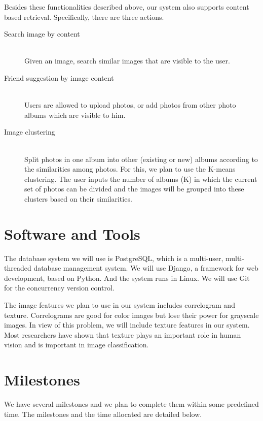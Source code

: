 \documentclass[a4paper,12pt]{article}
\begin{document}
{Besides these functionalities described above, our system also supports content based retrieval. Specifically, there are three actions. 

\begin{description}
  \item[Search image by content] \hfill \\
  Given an image, search similar images that are visible to the user.
  \item[Friend suggestion by image content] \hfill \\
  Users are allowed to upload photos, or add photos from other photo albums which are visible to him. 
  \item[Image clustering] \hfill \\
  Split photos in one album into other (existing or new) albums according to the similarities among photos. For this, we plan to use the K-means clustering. The user inputs the number of albums (K) in which the current set of photos can be divided and the images will be grouped into these clusters based on their similarities.
\end{description}

\section*{Software and Tools}
The database system we will use is PostgreSQL\cite{postgres}, which is a multi-user, multi-threaded database management system. We will use Django\cite{django}, a framework for web development, based on Python. And the system runs in Linux. We will use Git\cite{git} for the concurrency version control.

The image features we plan to use in our system includes correlogram\cite{correlogram} and texture. Correlograms are good for color images but lose their power for grayscale images. In view of this problem, we will include texture features in our system. Most researchers have shown that texture plays an important role in human vision and is important in image classification.

\section*{Milestones}
We have several milestones and we plan to complete them within some predefined time. The milestones and the time allocated are detailed below.


}
\end{document}
